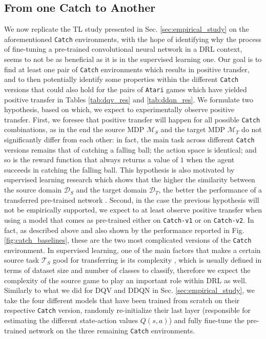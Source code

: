 \subsection{From one Catch to Another}
\label{sec:from_one_catch_to_another}
We now replicate the TL study presented in Sec. \ref{sec:empirical_study} on the aforementioned \texttt{Catch} environments, with the hope of identifying why the process of fine-tuning a pre-trained convolutional neural network in a DRL context, seems to not be as beneficial as it is in the supervised learning one. Our goal is to find at least one pair of \texttt{Catch} environments which results in positive transfer, and to then potentially identify some properties within the different \texttt{Catch} versions that could also hold for the pairs of \texttt{Atari} games which have yielded positive transfer in Tables \ref{tab:dqv_res} and \ref{tab:ddqn_res}. We formulate two hypothesis, based on which, we expect to experimentally observe positive transfer. First, we foresee that positive transfer will happen for all possible \texttt{Catch} combinations, as in the end the source MDP $\mathcal{M}_S$ and the target MDP $\mathcal{M}_T$ do not significantly differ from each other: in fact, the main task across different \texttt{Catch} versions remains that of catching a falling ball; the action space is identical; and so is the reward function that always returns a value of $1$ when the agent succeeds in catching the falling ball. This hypothesis is also motivated by supervised learning research which shows that the higher the similarity between the source domain $\mathcal{D}_S$ and the target domain $\mathcal{D}_T$, the better the performance of a transferred pre-trained network \cite{sabatelli2018deep}.
Second, in the case the previous hypothesis will not be empirically supported, we expect to at least observe positive transfer when using a model that comes as pre-trained either on \texttt{Catch-v1} or on \texttt{Catch-v2}. In fact, as described above and also shown by the performance reported in Fig. \ref{fig:catch_baselines}, these are the two most complicated versions of the \texttt{Catch} environment. In supervised learning, one of the main factors that makes a certain source task $\mathcal{T}_S$ good for transferring is its complexity \cite{mensink2021factors}, which is usually defined in terms of dataset size and number of classes to classify, therefore we expect the complexity of the source game to play an important role within DRL as well. Similarly to what we did for DQV and DDQN in Sec. \ref{sec:empirical_study}, we take the four different models that have been trained from scratch on their respective \texttt{Catch} version, randomly re-initialize their last layer (responsible for estimating the different state-action values $Q(s,a)$) and fully fine-tune the pre-trained network on the three remaining \texttt{Catch} environments.
